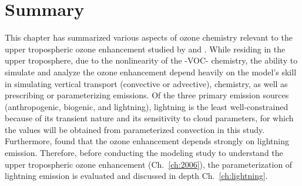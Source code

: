 \section{Summary} \label{sect:intro/summary}

This chapter has summarized various aspects of ozone chemistry relevant to the upper tropospheric ozone
enhancement studied by \citet{Li:2005ss} and \citet{Cooper:2007cr}. While residing in the upper
troposphere, due to the nonlinearity of the -VOC- chemistry, the ability to
simulate and analyze the ozone enhancement depend heavily on the model's skill in simulating
vertical transport (convective or advective), chemistry, as well as prescribing or parameterizing emissions.
Of the three primary emission sources (anthropogenic, biogenic, and lightning), lightning 
is the least well-constrained because of its transient nature and its sensitivity to cloud parameters, for which
the values will be obtained from parameterized convection in this study. Furthermore, \citet{Cooper:2009nx} found that the ozone
enhancement depends strongly on lightning emission. Therefore, before conducting the modeling
study to understand the upper tropospheric ozone enhancement (Ch.~\ref{ch:2006}), the parameterization
of lightning emission is evaluated and discussed in depth Ch.~\ref{ch:lightning}.

